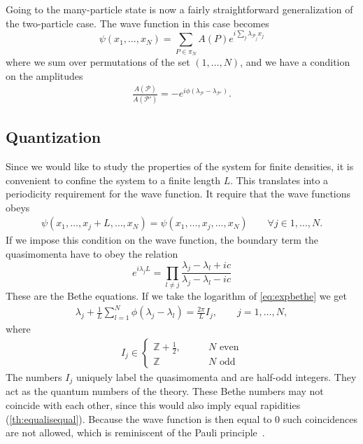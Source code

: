 \documentclass[11pt, a4paper]{report} %
\begin{document}
Going to the many-particle state is now a fairly straightforward generalization of the two-particle case.
The wave function in this case becomes~\cite{Gaudin2009}
\begin{equation}
	\psi(x_1,\ldots,x_N) = \sum_{P\in\pi_N} A(P) e^{i\sum_j \lambda_{\mathcal{P}_j} x_j}
\end{equation}
where we sum over permutations of the set \((1,\ldots,N)\), and we have a condition on the amplitudes~\cite{Franchini2017}
\begin{align}
  \label{eq:41}
  \frac{A(\mathcal{P})}{A(\mathcal{P'})} = -e^{i\phi(\lambda_{\mathcal{P}} - \lambda_{\mathcal{P'}})}.
\end{align}


\subsection{Quantization}

Since we would like to study the properties of the system for finite densities, it is convenient to confine the system to a finite length \(L\).
This translates into a periodicity requirement for the wave function.
It require that the wave functions obeys~\cite{Franchini2017}
\begin{align}
	\psi(x_1,\ldots,x_j+L,\ldots,x_N) = \psi(x_1,\ldots,x_j,\ldots,x_N) \qquad \forall j\in 1,\ldots,N.
\end{align}
If we impose this condition on the wave function, the boundary term the quasimomenta have to obey the relation~\cite{Korepin1993}
\begin{equation}
  \label{eq:expbethe}
  e^{i\lambda_jL} = \prod_{l\neq j} \frac{\lambda_j-\lambda_l + ic}{\lambda_j - \lambda_l - ic}
\end{equation}
These are the Bethe equations.
If we take the logarithm of \cref{eq:expbethe} we get
\begin{align}
  \label{eq:bethe_equations}
  \lambda_j + \frac{1}{L} \sum_{l=1}^N \phi(\lambda_j - \lambda_l) = \frac{2\pi}{L}I_j, \qquad j = 1,\ldots,N,
\end{align}
where
\begin{align}
I_j \in 
\begin{cases}
  \mathbb{Z} + \frac{1}{2}, \qquad &N \textrm{ even}\\
  \mathbb{Z}  &N \textrm{ odd}
\end{cases}
\end{align}
The numbers \(I_j\) uniquely label the quasimomenta and are half-odd integers. 
They act as the quantum numbers of the theory.
These Bethe numbers may not coincide with each other, since this would also imply equal rapidities (\cref{th:equalisequal}).
Because the wave function is then equal to 0 such coincidences are not allowed, which is reminiscent of the Pauli principle~\cite{Caux2009,Franchini2017}.
\end{document}
